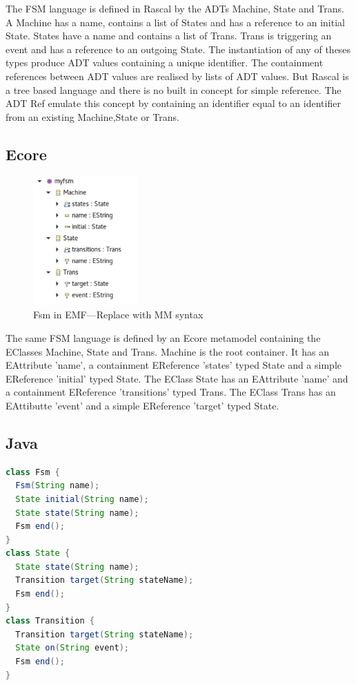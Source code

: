 \documentclass[sigplan]{acmart}
\begin{document}
The FSM language is defined in Rascal by the ADTs Machine, State and Trans.
A Machine has a name, contains a list of States and has a reference to an initial State.
States have a name and contains a list of Trans.
Trans is triggering an event and has a reference to an outgoing State.
The instantiation of any of theses types produce ADT values containing a unique identifier.
The containment references between ADT values are realised by lists of ADT values. But Rascal is a tree based language and there is no built in concept for simple reference.
The ADT Ref emulate this concept by containing an identifier equal to an identifier from an existing Machine,State or Trans.

\subsection{Ecore}
\begin{figure}
	\includegraphics[width=4cm]{figures/fsm-ecore.pdf}
	\caption{Fsm in EMF---Replace with MM syntax}
	\label{fig:fsmEcore}
\end{figure}

The same FSM language is defined by an Ecore metamodel containing the EClasses Machine, State and Trans.
Machine is the root container. It has an EAttribute ’name’, a containment EReference ’states’ typed State and a simple EReference ’initial’ typed State.
The EClass State has an EAttribute ’name’ and a containment EReference ’transitions’ typed Trans.
The EClass Trans has an EAttibutte ’event’ and a simple EReference ’target’ typed State.

\subsection{Java}
\begin{minipage}{\columnwidth}
\begin{lstlisting}[label=lst:fsm-api, caption={FSM in Fluent API}, language=Java]
class Fsm {
  Fsm(String name);
  State initial(String name);
  State state(String name);
  Fsm end();
}
class State {
  State state(String name);
  Transition target(String stateName);
  Fsm end();
}
class Transition {
  Transition target(String stateName);
  State on(String event);
  Fsm end();
}
\end{lstlisting}
\end{minipage}
\end{document}
